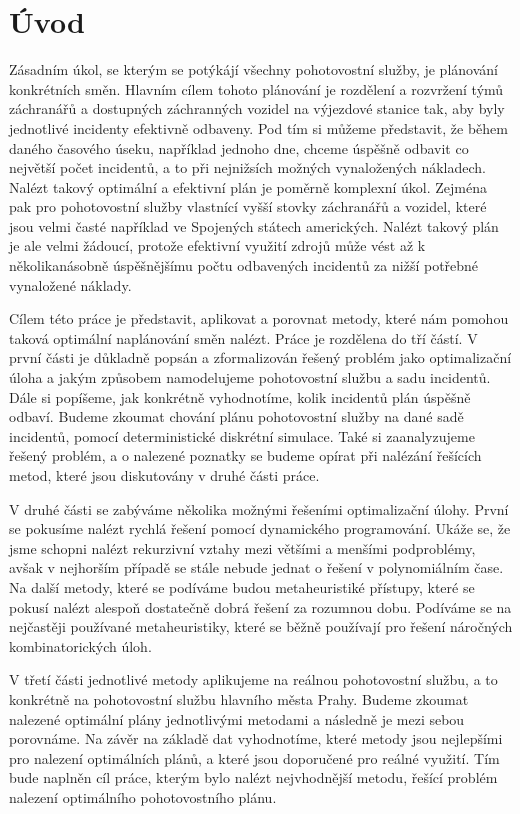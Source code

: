\chapter*{Úvod}

Zásadním úkol, se kterým se potýkájí všechny pohotovostní služby, je plánování konkrétních směn.
Hlavním cílem tohoto plánování je rozdělení a rozvržení týmů záchranářů a dostupných záchranných vozidel na výjezdové stanice tak, aby byly jednotlivé incidenty efektivně odbaveny. 
Pod tím si můžeme představit, že během daného časového úseku, například jednoho dne, chceme úspěšně odbavit co největší počet incidentů, a to při nejnižsích možných vynaložených nákladech.
Nalézt takový optimální a efektivní plán je poměrně komplexní úkol. Zejména pak pro pohotovostní služby
vlastnící vyšší stovky záchranářů a vozidel, které jsou velmi časté například ve Spojených státech amerických. 
Nalézt takový plán je ale velmi žádoucí, protože efektivní využití zdrojů může vést až k několikanásobně úspěšnějšímu
počtu odbavených incidentů za nižší potřebné vynaložené náklady.

Cílem této práce je představit, aplikovat a porovnat metody, které nám pomohou taková optimální naplánování směn nalézt. 
Práce je rozdělena do tří částí.
V první části je důkladně popsán a zformalizován řešený problém jako optimalizační úloha a jakým způsobem namodelujeme pohotovostní službu a sadu incidentů.
Dále si popíšeme, jak konkrétně vyhodnotíme, kolik incidentů plán úspěšně odbaví.
Budeme zkoumat chování plánu pohotovostní služby na dané sadě incidentů, pomocí deterministické diskrétní simulace.
Také si zaanalyzujeme řešený problém, a o nalezené poznatky se budeme opírat při nalézání řešících metod, které jsou diskutovány v druhé části práce.

V druhé části se zabýváme několika možnými řešeními optimalizační úlohy.
První se pokusíme nalézt rychlá řešení pomocí dynamického programování.
Ukáže se, že jsme schopni nalézt rekurzivní vztahy mezi většími a menšími podproblémy, avšak v nejhorším případě se stále nebude jednat o řešení v polynomiálním čase.
Na další metody, které se podíváme budou metaheuristiké přístupy, které se pokusí nalézt alespoň dostatečně dobrá řešení za rozumnou dobu.
Podíváme se na nejčastěji používané metaheuristiky, které se běžně používají pro řešení náročných kombinatorických úloh.

V třetí části jednotlivé metody aplikujeme na reálnou pohotovostní službu, a to konkrétně na pohotovostní službu hlavního města Prahy.
Budeme zkoumat nalezené optimální plány jednotlivými metodami a následně je mezi sebou porovnáme.
Na závěr na základě dat vyhodnotíme, které metody jsou nejlepšími pro nalezení optimálních plánů, a které jsou doporučené pro reálné využití.
Tím bude naplněn cíl práce, kterým bylo nalézt nejvhodnější metodu, řešící problém nalezení optimálního pohotovostního plánu. 

